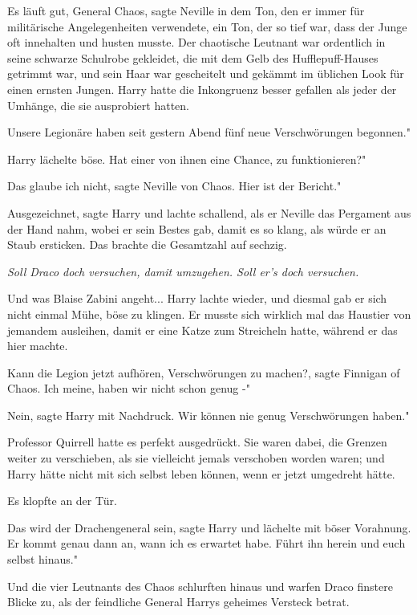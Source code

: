 \glqq Es läuft gut, General Chaos\grqq{}, sagte Neville in dem Ton, den er immer
für militärische Angelegenheiten verwendete, ein Ton, der so tief war, dass der
Junge oft innehalten und husten musste. Der chaotische Leutnant war ordentlich
in seine schwarze Schulrobe gekleidet, die mit dem Gelb des Hufflepuff-Hauses
getrimmt war, und sein Haar war gescheitelt und gekämmt im üblichen Look für
einen ernsten Jungen. Harry hatte die Inkongruenz besser gefallen als jeder der
Umhänge, die sie ausprobiert hatten.

\glqq Unsere Legionäre haben seit gestern Abend fünf neue Verschwörungen
begonnen."

Harry lächelte böse. \glqq Hat einer von ihnen eine Chance, zu funktionieren?"

\glqq Das glaube ich nicht\grqq{}, sagte Neville von Chaos. \glqq Hier ist der
Bericht."

\glqq Ausgezeichnet\grqq{}, sagte Harry und lachte schallend, als er Neville das
Pergament aus der Hand nahm, wobei er sein Bestes gab, damit es so klang, als
würde er an Staub ersticken. Das brachte die Gesamtzahl auf sechzig.

\emph{Soll Draco doch versuchen, damit umzugehen. Soll er's doch versuchen.}

Und was Blaise Zabini angeht... Harry lachte wieder, und diesmal gab er sich
nicht einmal Mühe, böse zu klingen. Er musste sich wirklich mal das Haustier von
jemandem ausleihen, damit er eine Katze zum Streicheln hatte, während er das
hier machte.

\glqq Kann die Legion jetzt aufhören, Verschwörungen zu machen?\grqq{}, sagte
Finnigan of Chaos. \glqq Ich meine, haben wir nicht schon genug -"

\glqq Nein\grqq{}, sagte Harry mit Nachdruck. \glqq Wir können nie genug
Verschwörungen haben."

Professor Quirrell hatte es perfekt ausgedrückt. Sie waren dabei, die Grenzen
weiter zu verschieben, als sie vielleicht jemals verschoben worden waren; und
Harry hätte nicht mit sich selbst leben können, wenn er jetzt umgedreht hätte.

Es klopfte an der Tür.

\glqq Das wird der Drachengeneral sein\grqq{}, sagte Harry und lächelte mit
böser Vorahnung. \glqq Er kommt genau dann an, wann ich es erwartet habe. Führt
ihn herein und euch selbst hinaus."

Und die vier Leutnants des Chaos schlurften hinaus und warfen Draco finstere
Blicke zu, als der feindliche General Harrys geheimes Versteck betrat.

